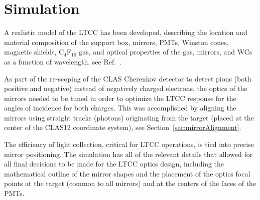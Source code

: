 \section{Simulation}

A realistic model of the LTCC has been developed, describing the location and material composition of the support
box, mirrors, PMTs, Winston cones, magnetic shields, C$_4$F$_{10}$ gas, and optical properties of the gas, mirrors,
and WCs as a function of wavelength, see Ref.~\cite{sim-nim}.

As part of the re-scoping of the CLAS Cherenkov detector to detect pions (both positive and negative) instead of
negatively charged electrons, the optics of the mirrors needed to be tuned in order to optimize the LTCC response
for the angles of incidence for both charges. This was accomplished by aligning the mirrors using straight tracks
(photons) originating from the target (placed at the center of the CLAS12 coordinate system), see
Section~\ref{sec:mirrorAlignment}.

The efficiency of light collection, critical for LTCC operations, is tied into precise mirror positioning. The simulation
has all of the relevant details that allowed for all final decisions to be made for the LTCC optics design, including the
mathematical outline of the mirror shapes and the placement of the optics focal points at the target (common to all
mirrors) and at the centers of the faces of the PMTs.



